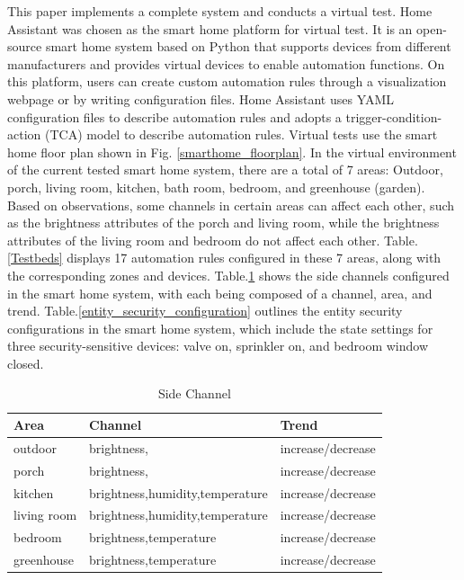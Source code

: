 This paper implements a complete system and conducts a virtual test. Home Assistant was chosen as the smart home platform for virtual test. It is an open-source smart home system based on Python that supports devices from different manufacturers and provides virtual devices to enable automation functions. On this platform, users can create custom automation rules through a visualization webpage or by writing configuration files. Home Assistant uses YAML configuration files to describe automation rules and adopts a trigger-condition-action (TCA) model to describe automation rules. Virtual tests use the smart home floor plan shown in Fig. \ref{smarthome_floorplan}. In the virtual environment of the current tested smart home system, there are a total of 7 areas: Outdoor, porch, living room, kitchen, bath room, bedroom, and greenhouse (garden). Based on observations, some channels in certain areas can affect each other, such as the brightness attributes of the porch and living room, while the brightness attributes of the living room and bedroom do not affect each other. Table.\ref{Testbeds} displays 17 automation rules configured in these 7 areas, along with the corresponding zones and devices. Table.\ref{side_channel} shows the side channels configured in the smart home system, with each being composed of a channel, area, and trend. Table.\ref{entity_security_configuration} outlines the entity security configurations in the smart home system, which include the state settings for three security-sensitive devices: valve on, sprinkler on, and bedroom window closed.

\begin{table}[htbp]
	\caption{Side Channel}
	\label{side_channel}
	\begin{tabular}[width=0.45\textwidth]{l|l|l}
		\hline
		\textbf{Area} & \textbf{Channel} & \textbf{Trend} \\
		\hline
		outdoor& brightness, & increase/decrease \\
		\hline
		porch& brightness, & increase/decrease \\
		\hline
		kitchen& brightness,humidity,temperature & increase/decrease \\
		\hline
		living room & brightness,humidity,temperature & increase/decrease \\
		\hline
		bedroom & brightness,temperature & increase/decrease \\
		\hline
		greenhouse & brightness,temperature & increase/decrease \\
		\hline
	\end{tabular}
\end{table}


